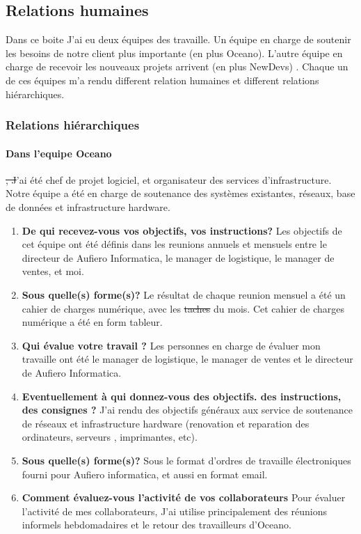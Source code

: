 \documentclass{resume} %
\providecommand{\DIFaddtex}[1]{{\protect\color{blue}\uwave{#1}}} %
\providecommand{\DIFdeltex}[1]{{\protect\color{red}\sout{#1}}}                      %
\providecommand{\DIFaddbegin}{} %
\providecommand{\DIFaddend}{} %
\providecommand{\DIFdelbegin}{} %
\providecommand{\DIFdelend}{} %
\providecommand{\DIFadd}[1]{\texorpdfstring{\DIFaddtex{#1}}{#1}} %
\providecommand{\DIFdel}[1]{\texorpdfstring{\DIFdeltex{#1}}{}} %
\begin{document}
\subsection{Relations humaines} 

	Dans ce boite J'ai eu deux équipes des travaille. Un équipe en charge de soutenir les besoins de notre client plus importante (en plus Oceano). L'autre équipe en charge de recevoir les nouveaux projets arrivent (en plus NewDevs)  . 
	Chaque un de ces équipes m'a rendu different relation humaines et different relations hiérarchiques.  

	\subsubsection{Relations hiérarchiques} 


		\paragraph{Dans l'equipe Oceano\DIFaddbegin \DIFadd{,}\DIFaddend } \DIFdelbegin \DIFdel{, 	J}\DIFdelend \DIFaddbegin \DIFadd{j}\DIFaddend 'ai été chef de projet logiciel, et organisateur des services d'infrastructure.  Notre équipe a été en charge de soutenance des systèmes existantes, réseaux, base de données et infrastructure hardware. 

		 \begin{enumerate} 
		\item \textbf{De qui recevez-vous vos objectifs, vos instructions?}
			Les objectifs de cet équipe ont été définis dans les reunions annuels et mensuels entre le directeur de Aufiero Informatica, le manager de logistique, le manager de ventes, et moi.
		\item \textbf{Sous quelle(s) forme(s)?}
			Le résultat de chaque reunion mensuel a été un cahier de charges numérique, avec les \DIFdelbegin \DIFdel{taches }\DIFdelend \DIFaddbegin \DIFadd{tâches }\DIFaddend du mois. Cet cahier de charges numérique  a été en form tableur.
		\item \textbf{Qui évalue votre travail ?}
			Les personnes en charge de évaluer mon travaille ont été  le manager de logistique, le manager de ventes et le directeur de Aufiero Informatica. 
		\item  \textbf{Eventuellement à qui donnez-vous des objectifs. des instructions, des consignes ?}
			J'ai rendu des objectifs généraux aux service de soutenance de réseaux et infrastructure hardware (renovation et reparation des ordinateurs, serveurs , imprimantes, etc).
		\item \textbf{Sous quelle(s) forme(s)?}
			Sous le format d'ordres de travaille électroniques fourni pour Aufiero informatica, et aussi en format email. 
		\item \textbf{Comment évaluez-vous l'activité de vos collaborateurs}
			Pour évaluer l'activité de mes collaborateurs, J'ai utilise principalement des réunions informels hebdomadaires et le retour des travailleurs d'Oceano. 
		 \end{enumerate} 
\end{document}
